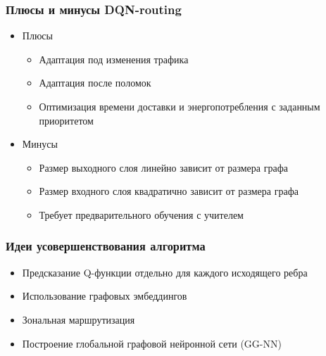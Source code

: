 \documentclass{beamer}
\begin{document}
\begin{frame}
\begin{columns}
\begin{column}{0.5\textwidth}
    \end{column}
  \end{columns}
\end{frame}


\begin{frame}
  \frametitle{Плюсы и минусы DQN-routing}
  \begin{itemize}
  \item Плюсы
    \begin{itemize}
    \item Адаптация под изменения трафика
    \item Адаптация после поломок
    \item Оптимизация времени доставки и энергопотребления с заданным приоритетом
    \end{itemize}
  \item Минусы
    \begin{itemize}
    \item Размер выходного слоя линейно зависит от размера графа
    \item Размер входного слоя квадратично зависит от размера графа
    \item Требует предварительного обучения с учителем
    \end{itemize}
  \end{itemize}
\end{frame}


\begin{frame}
  \frametitle{Идеи усовершенствования алгоритма}
  \begin{itemize}
  \item Предсказание Q-функции отдельно для каждого исходящего ребра
  \item Использование графовых эмбеддингов
  \item Зональная маршрутизация
  \item Построение глобальной графовой нейронной сети (GG-NN)
  \end{itemize}
\end{frame}

\end{document}
